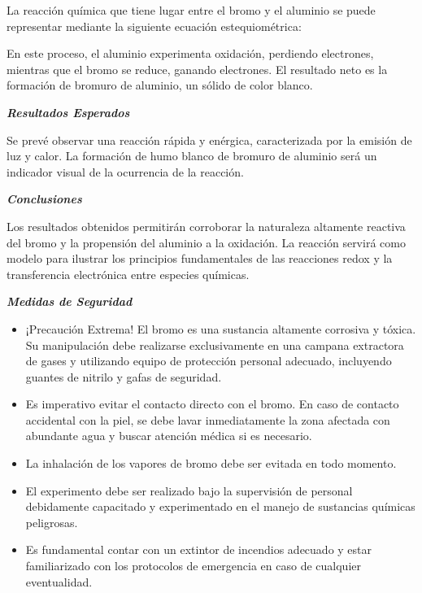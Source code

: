     La reacción química que tiene lugar entre el bromo y el aluminio se puede representar mediante la siguiente ecuación estequiométrica:  
    
    
    En este proceso, el aluminio experimenta oxidación, perdiendo electrones, mientras que el bromo se reduce, ganando electrones. El resultado neto es la formación de bromuro de aluminio, un sólido de color blanco.  
    
    \textit{\textbf{Resultados Esperados }} 
    
    Se prevé observar una reacción rápida y enérgica, caracterizada por la emisión de luz y calor. La formación de humo blanco de bromuro de aluminio será un indicador visual de la ocurrencia de la reacción.  
    
    \textit{\textbf{Conclusiones}}  
    
    Los resultados obtenidos permitirán corroborar la naturaleza altamente reactiva del bromo y la propensión del aluminio a la oxidación. La reacción servirá como modelo para ilustrar los principios fundamentales de las reacciones redox y la transferencia electrónica entre especies químicas.  
    
    \textit{\textbf{Medidas de Seguridad }} 
    \begin{itemize}
        \item ¡Precaución Extrema! El bromo es una sustancia altamente corrosiva y tóxica. Su manipulación debe realizarse exclusivamente en una campana extractora de gases y utilizando equipo de protección personal adecuado, incluyendo guantes de nitrilo y gafas de seguridad.  
        
        \item Es imperativo evitar el contacto directo con el bromo. En caso de contacto accidental con la piel, se debe lavar inmediatamente la zona afectada con abundante agua y buscar atención médica si es necesario.  
        
        \item La inhalación de los vapores de bromo debe ser evitada en todo momento.  
        
        \item El experimento debe ser realizado bajo la supervisión de personal debidamente capacitado y experimentado en el manejo de sustancias químicas peligrosas.  
        
        \item Es fundamental contar con un extintor de incendios adecuado y estar familiarizado con los protocolos de emergencia en caso de cualquier eventualidad. 
    \end{itemize}